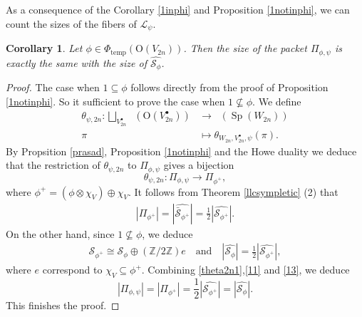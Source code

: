 \documentclass[article]{article}
\numberwithin{equation}{section}
\newtheorem{corollary}[theorem]{Corollary}
\theoremstyle{definition}
\DeclareMathOperator{\SP}{Sp}
\DeclareMathOperator{\Irrt}{Irr_{temp}}
\begin{document}
As a consequence of the Corollary \ref{1inphi} and Proposition \ref{1notinphi}, we can count the sizes of the fibers of $\mathcal L_{\psi}$. 
\begin{corollary}\label{size}
	Let $\phi\in \Phi_{\mathrm {temp}}(\mathrm O(V_{2n}))$. Then the size of the packet $\Pi_{\phi,\psi}$ is exactly the same with the size of $\widehat{\mathcal {S}_{\phi}}$. 
\end{corollary}
\begin{proof}
The case when $1\subseteq \phi$ follows directly from the proof of Proposition \ref{1notinphi}. So it sufficient to prove the case when 
$1\nsubseteq \phi$. We define 
	\begin{align*}
	\theta_{\psi,2n}: \bigsqcup_{V_{2n}^{\bullet}}\Irrt \left(\mathrm O(V_{2n}^{\bullet})\right)&\longrightarrow \Irrt \left(\SP(W_{2n})\right)\\
	\pi &\mapsto \theta_{W_{2n}, V_{2n}^{\bullet} ,\psi}(\pi). 
	\end{align*}
	By Propsition \ref{prasad}, Proposition \ref{1notinphi} and the Howe duality we deduce that the restriction of $\theta_{\psi,2n}$ to $\Pi_{\phi,\psi}$ gives a bijection 
	\begin{equation}\label{theta2n1}
	\theta_{\psi,2n}: \Pi_{\phi,\psi} \rightarrow \Pi_{\phi^+},
	\end{equation}
	where $\phi^+=(\phi\otimes\chi_{V})\oplus \chi_{V}$.
	It follows from Theorem \ref{llcsympletic} (2) that 
	\begin{align}\label{11}
	|\Pi_{\phi^+}|=|\widehat{\bar {\mathcal S}_{\phi^+}}|=\frac{1}{2}|\widehat{ \mathcal S_{\phi^+}}|.
	\end{align}
	On the other hand, since $\mathrm{1}\nsubseteq \phi$, we deduce  
	\begin{align}\label{13}
	\mathcal S_{\phi^+}\cong \mathcal {S}_{\phi}\oplus (\mathbb{Z}/2\mathbb{Z}) e \quad \mbox{and}\quad |\widehat{\mathcal {S}_{\phi}}|=\frac{1}{2}|\widehat{\mathcal S_{\phi^+}}|,
	\end{align}
	where $e$ correspond to $\chi_{V} \subseteq \phi^+$. Combining \ref{theta2n1},\ref{11} and \ref{13}, we deduce $$|\Pi_{\phi,\psi}|=|\Pi_{\phi^+}|=\frac{1}{2}|\widehat{\mathcal S_{\phi^+}}|=|\widehat{\mathcal {S}_{\phi}}|.$$ This finishes the proof. 
\end{proof}


\end{document}
